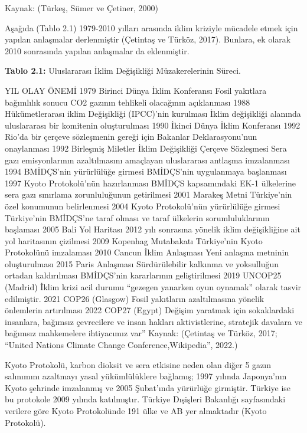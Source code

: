 \documentclass[
]{book}
\begin{document}
Kaynak: (Türkeş, Sümer ve Çetiner, 2000)

Aşağıda (Tablo 2.1) 1979-2010 yılları arasında iklim kriziyle mücadele etmek için yapılan anlaşmalar derlenmiştir (Çetintaş ve Türköz, 2017). Bunlara, ek olarak 2010 sonrasında yapılan anlaşmalar da eklenmiştir.

\textbf{Tablo 2.1:} Uluslararası İklim Değişikliği Müzakerelerinin Süreci.

YIL OLAY ÖNEMİ
1979 Birinci Dünya İklim Konferansı Fosil yakıtlara bağımlılık sonucu
CO2 gazının tehlikeli olacağının açıklanması
1988 Hükümetlerarası iklim Değişikliği
(IPCC)'nin kurulması İklim değişikliği alanında
uluslararası bir komitenin oluşturulması
1990 İkinci Dünya İklim Konferansı 1992 Rio'da bir çerçeve sözleşmenin gereği için
Bakanlar Deklarasyonu'nun onaylanması
1992 Birleşmiş Miletler İklim Değişikliği
Çerçeve Sözleşmesi Sera gazı emisyonlarının azaltılmasını amaçlayan
uluslararası antlaşma imzalanması
1994 BMİDÇS'nin yürürlülüğe girmesi BMİDÇS'nin uygulanmaya başlanması
1997 Kyoto Protokolü'nün hazırlanması BMİDÇS kapsamındaki EK-1 ülkelerine
sera gazı sınırlama zorunluluğunun getirilmesi
2001 Marakeş Metni Türkiye'nin özel konumunun belirlenmesi
2004 Kyoto Protokolü'nün yürürlülüğe girmesi Türkiye'nin BMİDÇS'ne taraf olması ve
taraf ülkelerin sorumluluklarının başlaması
2005 Bali Yol Haritası 2012 yılı sonrasına yönelik iklim değişikliğine ait
yol haritasının çizilmesi
2009 Kopenhag Mutabakatı Türkiye'nin Kyoto Protokolünü imzalaması
2010 Cancun İklim Anlaşması Yeni anlaşma metninin oluşturulması
2015 Paris Anlaşması Sürdürülebilir kalkınma ve yoksulluğun ortadan
kaldırılması BMİDÇS'nin kararlarının geliştirilmesi
2019 UNCOP25 (Madrid) İklim krizi acil durumu ``gezegen yanarken oyun
oynamak'' olarak tasvir edilmiştir.
2021 COP26 (Glasgow) Fosil yakıtların azaltılmasına yönelik önlemlerin
artırılması
2022 COP27 (Egypt) Değişim yaratmak için sokaklardaki insanlara, bağımsız çevrecilere ve insan hakları aktivistlerine, stratejik davalara ve bağımsız mahkemelere ihtiyacımız var''
Kaynak: (Çetintaş ve Türköz, 2017; ``United Nations Climate Change Conference,Wikipedia'', 2022.)

Kyoto Protokolü, karbon dioksit ve sera etkisine neden olan diğer 5 gazın salınımını azaltmayı yasal yükümlülüklere bağlamış; 1997 yılında Japonya'nın Kyoto şehrinde imzalanmış ve 2005 Şubat'ında yürürlüğe girmiştir. Türkiye ise bu protokole 2009 yılında katılmıştır. Türkiye Dışişleri Bakanlığı sayfasındaki verilere göre Kyoto Protokolünde 191 ülke ve AB yer almaktadır (Kyoto Protokolü). \citep{kyoto2019kyoto}
\end{document}
